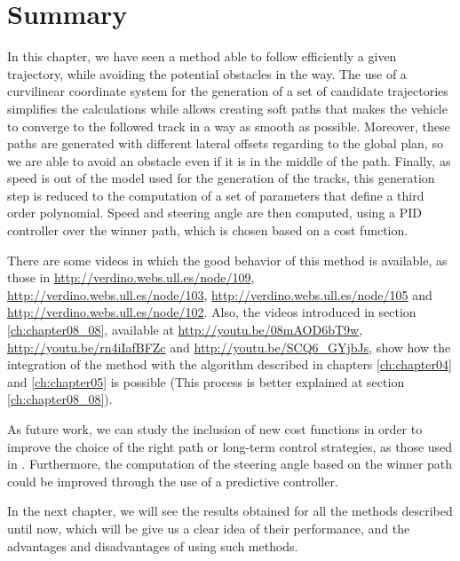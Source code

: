 % 

\section{Summary}\label{ch:chapter07_07}

In this chapter, we have seen a method able to follow efficiently a given trajectory, while avoiding the potential obstacles in the way. The use of a curvilinear coordinate system for the generation of a set of candidate trajectories simplifies the calculations while allows creating soft paths that makes the vehicle to converge to the followed track in a way as smooth as possible. Moreover, these paths are generated with different lateral offsets regarding to the global plan, so we are able to avoid an obstacle even if it is in the middle of the path. Finally, as speed is out of the model used for the generation of the tracks, this generation step is reduced to the computation of a set of parameters that define a third order polynomial. Speed and steering angle are then computed, using a \ac{PID} controller over the winner path, which is chosen based on a cost function.

There are some videos in which the good behavior of this method is available, as those in \url{http://verdino.webs.ull.es/node/109}, \url{http://verdino.webs.ull.es/node/103}, \url{http://verdino.webs.ull.es/node/105} and \url{http://verdino.webs.ull.es/node/102}. Also, the videos introduced in section \ref{ch:chapter08_08}, available at \url{http://youtu.be/08mAOD6bT9w}, \url{http://youtu.be/rn4iIafBFZc} and \url{http://youtu.be/SCQ6_GYjbJs}, show how the integration of the method with the algorithm described in chapters \ref{ch:chapter04} and \ref{ch:chapter05} is possible (This process is better explained at section \ref{ch:chapter08_08}).

As future work, we can study the inclusion of new cost functions in order to improve the choice of the right path or long-term control strategies, as those used in \cite{werling2010optimal}. Furthermore, the computation of the steering angle based on the winner path could be improved through the use of a predictive controller.

In the next chapter, we will see the results obtained for all the methods described until now, which will be give us a clear idea of their performance, and the advantages and disadvantages of using such methods.


